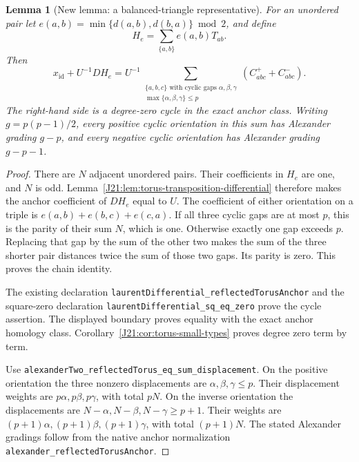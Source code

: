 \documentclass[11pt,oneside]{report}
\newtheorem{lemma}[theorem]{Lemma}
\theoremstyle{definition}
\numberwithin{equation}{section}
\newcommand{\decl}[1]{\textnormal{\nolinkurl{#1}}}
\begin{document}
\begin{lemma}[New lemma: a balanced-triangle representative]
\label{J21:lem:torus-balanced-first}
For an unordered pair let
$e(a,b)=\min\{d(a,b),d(b,a)\}\bmod2$, and define
\[
 H_e=\sum_{\{a,b\}} e(a,b)T_{ab}.
\]
Then
\[
 x_{\mathrm{id}}+U^{-1}D H_e
 =U^{-1}\sum_{\substack{\{a,b,c\}\text{ with cyclic gaps }\alpha,\beta,\gamma\\
                       \max\{\alpha,\beta,\gamma\}\leq p}}
       (C_{abc}^{+}+C_{abc}^{-}).
\]
The right-hand side is a degree-zero cycle in the exact anchor class.
Writing $g=p(p-1)/2$, every positive cyclic orientation in this sum has
Alexander grading $g-p$, and every negative cyclic orientation has
Alexander grading $g-p-1$.
\end{lemma}
\begin{proof}
There are $N$ adjacent unordered pairs. Their coefficients in $H_e$ are
one, and $N$ is odd. Lemma~\ref{J21:lem:torus-transposition-differential}
therefore makes the anchor coefficient of $D H_e$ equal to $U$.
The coefficient of either orientation on a triple is
$e(a,b)+e(b,c)+e(c,a)$.
If all three cyclic gaps are at most $p$, this is the parity of their
sum $N$, which is one. Otherwise exactly one gap exceeds $p$.
Replacing that gap by the sum of the other two makes the sum of the
three shorter pair distances twice the sum of those two gaps. Its
parity is zero. This proves the chain identity.

The existing declaration \decl{laurentDifferential_reflectedTorusAnchor}
and the square-zero declaration
\decl{laurentDifferential_sq_eq_zero} prove the cycle assertion.
The displayed boundary proves equality with the exact anchor homology
class. Corollary~\ref{J21:cor:torus-small-types} proves degree zero term by term.

Use \decl{alexanderTwo_reflectedTorus_eq_sum_displacement}.
On the positive orientation the three nonzero displacements are
$\alpha,\beta,\gamma\leq p$. Their displacement weights are
$p\alpha,p\beta,p\gamma$, with total $pN$.
On the inverse orientation the displacements are
$N-\alpha,N-\beta,N-\gamma\geq p+1$. Their weights are
$(p+1)\alpha,(p+1)\beta,(p+1)\gamma$, with total $(p+1)N$.
The stated Alexander gradings follow from the native anchor
normalization \decl{alexander_reflectedTorusAnchor}.
\end{proof}
\end{document}
